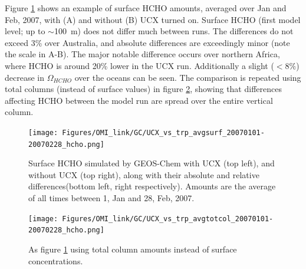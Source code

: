       Figure \ref{Model:GC:simulations:comparison:fig_UCXvsTrop_HCHO_surf_fullday} shows an example of surface HCHO amounts, averaged over Jan and Feb, 2007, with (A) and without (B) UCX turned on.
      Surface HCHO (first model level; up to $\sim$100~m) does not differ much between runs.
      The differences do not exceed 3\% over Australia, and absolute differences are exceedingly minor (note the scale in A-B).
      The major notable difference occurs over northern Africa, where HCHO is around 20\% lower in the UCX run.
      Additionally a slight ($<8\%$) decrease in $\Omega_{HCHO}$ over the oceans can be seen.
      The comparison is repeated using total columns (instead of surface values) in figure \ref{Model:GC:simulations:comparison:fig_UCXvsTrop_HCHO_totcol_fullday}, showing that differences affecting HCHO between the model run are spread over the entire vertical column.
      
      
      \begin{figure}
        \texttt{[image: Figures/OMI\_link/GC/UCX\_vs\_trp\_avgsurf\_20070101-20070228\_hcho.png]}
        \caption{%
          Surface HCHO simulated by GEOS-Chem with UCX (top left), and without UCX (top right), along with their absolute and relative differences(bottom left, right respectively).
          Amounts are the average of all times between 1, Jan and 28, Feb, 2007.
        }
        \label{Model:GC:simulations:comparison:fig_UCXvsTrop_HCHO_surf_fullday}
      \end{figure}
      
      \begin{figure}
        \texttt{[image: Figures/OMI\_link/GC/UCX\_vs\_trp\_avgtotcol\_20070101-20070228\_hcho.png]}
        \caption{%
          As figure \ref{Model:GC:simulations:comparison:fig_UCXvsTrop_HCHO_surf_fullday} using total column amounts instead of surface concentrations.
        }
        \label{Model:GC:simulations:comparison:fig_UCXvsTrop_HCHO_totcol_fullday}
      \end{figure}
      

      
